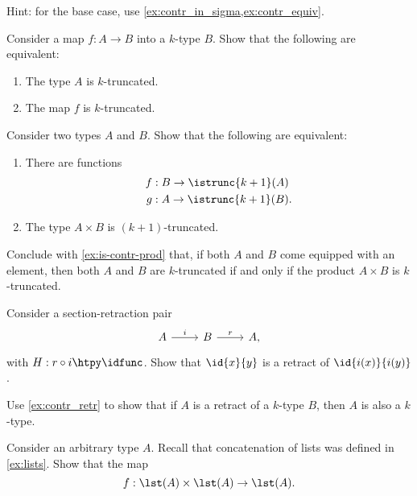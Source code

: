 \begin{exercises}
\begin{subexenum}
\begin{enumerate}
    \end{enumerate}
    Hint: for the base case, use \cref{ex:contr_in_sigma,ex:contr_equiv}.
  \item Consider a map $f:A\to B$ into a $k$-type $B$. Show that the following are equivalent:
    \begin{enumerate}
    \item The type $A$ is $k$-truncated.
    \item The map $f$ is $k$-truncated.
    \end{enumerate}
  \end{subexenum}
  \exitem Consider two types $A$ and $B$. Show that the following are equivalent:
    \begin{enumerate}
    \item There are functions
      \begin{align*}
        f & : B \to \istrunc{k+1}(A) \\
        g & : A \to \istrunc{k+1}(B).
      \end{align*}
    \item The type $A\times B$ is $(k+1)$-truncated.
    \end{enumerate}
    Conclude with \cref{ex:is-contr-prod} that, if both $A$ and $B$ come equipped with an element, then both $A$ and $B$ are $k$-truncated if and only if the product $A\times B$ is $k$-truncated.
  \exitem
  \begin{subexenum}
  \item \label{ex:retr_id} Consider a section-retraction pair
    \begin{equation*}
      \begin{tikzcd}
        A \arrow[r,"i"] & B \arrow[r,"r"] & A,
      \end{tikzcd}
    \end{equation*}
    with $H:r\circ i\htpy \idfunc$. Show that $\id{x}{y}$ is a retract of $\id{i(x)}{i(y)}$.
  \item Use \cref{ex:contr_retr} to show that if $A$ is a retract of a $k$-type $B$, then $A$ is also a $k$-type.
  \end{subexenum}
  \exitem Consider an arbitrary type $A$. Recall that concatenation of lists was defined in \cref{ex:lists}. Show that the map
  \begin{equation*}
    f:\lst(A)\times\lst(A)\to\lst(A).
  \end{equation*}

\end{exercises}
